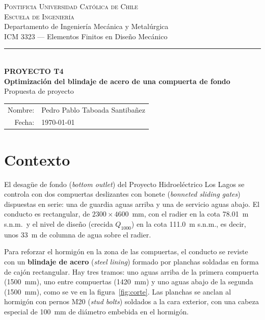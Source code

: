 \documentclass[11pt]{article}
\begin{document}
\begin{center}
    {\scshape\large Pontificia Universidad Cat\'olica de Chile}\\[2pt]
    {\scshape Escuela de Ingenier\'ia}\\[2pt]
    {\small Departamento de Ingenier\'ia Mec\'anica y Metal\'urgica}\\[2pt]
    {\small ICM 3323 --- Elementos Finitos en Dise\~no Mec\'anico}\\[10pt]
    {\color{ucred}\rule{0.42\linewidth}{0.6pt}}\\[10pt]
    {\Huge\bfseries\color{ucred} PROYECTO T4}\\[6pt]
    {\Large\bfseries Optimizaci\'on del blindaje de acero de una compuerta de fondo}\\[4pt]
    {\large Propuesta de proyecto}
\end{center}

\vspace{4pt}
\begin{flushright}
\renewcommand{\arraystretch}{1.4}
\begin{tabular}{rl}
    Nombre: & Pedro Pablo Taboada Santiba\~nez \\
    Fecha:  & \today\\
\end{tabular}
\end{flushright}

\vspace{0.3cm}

\section{Contexto}

El desag\"ue de fondo (\emph{bottom outlet}) del Proyecto Hidroel\'ectrico Los Lagos se controla con dos
compuertas deslizantes con bonete (\emph{bonneted sliding gates}) dispuestas en serie: una de guardia
aguas arriba y una de servicio aguas abajo. El conducto es rectangular, de
$2300 \times 4600$~mm, con el radier en la cota 78.01~m s.n.m.\ y el nivel de dise\~no (crecida
$Q_{1000}$) en la cota 111.0~m s.n.m., es decir, unos 33~m de columna de agua sobre el radier.

Para reforzar el hormig\'on en la zona de las compuertas, el conducto se reviste con un
\textbf{blindaje de acero} (\emph{steel lining}) formado por planchas soldadas en forma de caj\'on
rectangular. Hay tres tramos: uno aguas arriba de la primera compuerta (1500~mm), uno entre
compuertas (1420~mm) y uno aguas abajo de la segunda (1500~mm), como se ve en la
figura~\ref{fig:corte}. Las planchas se anclan al hormig\'on con pernos M20 (\emph{stud bolts}) soldados
a la cara exterior, con una cabeza especial de 100~mm de di\'ametro embebida en el hormig\'on.
\end{document}
